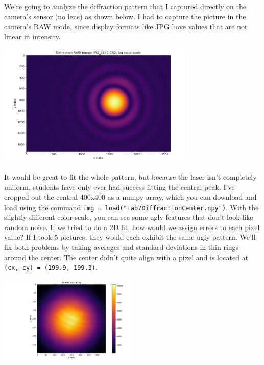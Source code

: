 \documentclass[11pt]{hmcpset}
\begin{document}

\begin{problem}
	We're going to analyze the diffraction pattern that I captured directly on the camera's sensor (no lens) as shown below. I had to capture the picture in the camera's RAW mode, since display formats like JPG have values that are not linear in intensity.
	
	\vspace{-1em}
	\begin{center}
		\includegraphics[width=0.70\textwidth]{diffraction2D_whole_image_log.png}
	\end{center}
	\vspace{-1em}

	It would be great to fit the whole pattern, but because the laser isn't completely uniform, students have only ever had success fitting the central peak. I've cropped out the central 400x400 as a numpy array, which you can download and load using the command \texttt{img = load("Lab7DiffractionCenter.npy")}. With the slightly different color scale, you can see some ugly features that don't look like random noise. If we tried to do a 2D fit, how would we assign errors to each pixel value? If I took 5 pictures, they would each exhibit the same ugly pattern. We'll fix both problems by taking averages and standard deviations in thin rings around the center. The center didn't quite align with a pixel and is located at \texttt{(cx, cy) = (199.9, 199.3)}.

	\vspace{-1em}
	\begin{center}
		\includegraphics[width=0.50\textwidth]{diffraction2D_saved_array.pdf}
	\end{center}
	\vspace{-1em}
	

\end{problem}
\end{document}
